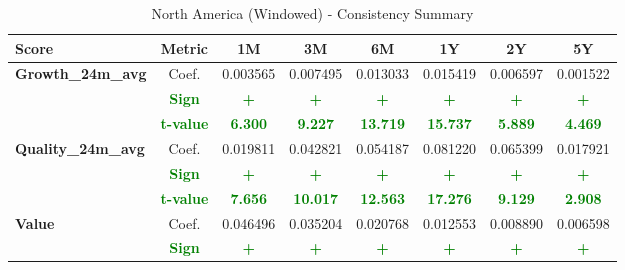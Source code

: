 \documentclass[11pt,english,a4paper,hidelinks]{book}
\begin{document}
\begin{table}[H]
    \centering
    \caption{North America (Windowed) - Consistency Summary}
    \begin{tabular}{lccccccc}
        \toprule
        \textbf{Score} & \textbf{Metric} & \textbf{1M} & \textbf{3M} & \textbf{6M} & \textbf{1Y} & \textbf{2Y} & \textbf{5Y} \\
        \midrule
        \multirow{3}{*}{\textbf{Growth\_24m\_avg}} 
        & Coef.   & 0.003565 & 0.007495 & 0.013033 & 0.015419 & 0.006597 & 0.001522 \\
        & \textbf{\textcolor{green}{Sign}}
                     & \textbf{\textcolor{green}{+}}
                     & \textbf{\textcolor{green}{+}}
                     & \textbf{\textcolor{green}{+}}
                     & \textbf{\textcolor{green}{+}}
                     & \textbf{\textcolor{green}{+}}
                     & \textbf{\textcolor{green}{+}} \\
        & \textbf{\textcolor{green}{t-value}}
                     & \textbf{\textcolor{green}{6.300}}
                     & \textbf{\textcolor{green}{9.227}}
                     & \textbf{\textcolor{green}{13.719}}
                     & \textbf{\textcolor{green}{15.737}}
                     & \textbf{\textcolor{green}{5.889}}
                     & \textbf{\textcolor{green}{4.469}} \\
        \midrule
        \multirow{3}{*}{\textbf{Quality\_24m\_avg}}
            & Coef.   & 0.019811 & 0.042821 & 0.054187 & 0.081220 & 0.065399 & 0.017921 \\
            & \textbf{\textcolor{green}{Sign}}    & \textbf{\textcolor{green}{+}}        & \textbf{\textcolor{green}{+}}        & \textbf{\textcolor{green}{+}}        & \textbf{\textcolor{green}{+}}        & \textbf{\textcolor{green}{+}}        & \textbf{\textcolor{green}{+}}        \\
            & \textbf{\textcolor{green}{t-value}} & \textbf{\textcolor{green}{7.656}}    & \textbf{\textcolor{green}{10.017}}   & \textbf{\textcolor{green}{12.563}}   & \textbf{\textcolor{green}{17.276}}   & \textbf{\textcolor{green}{9.129}}    & \textbf{\textcolor{green}{2.908}}    \\
        \midrule
        \multirow{3}{*}{\textbf{Value}}
            & Coef.   & 0.046496  & 0.035204  & 0.020768  & 0.012553  & 0.008890  & 0.006598  \\
            & \textbf{\textcolor{green}{Sign}}    & \textbf{\textcolor{green}{+}}         & \textbf{\textcolor{green}{+}}         & \textbf{\textcolor{green}{+}}         & \textbf{\textcolor{green}{+}}         & \textbf{\textcolor{green}{+}}         & \textbf{\textcolor{green}{+}}         \\

\end{tabular}
\end{table}
\end{document}
